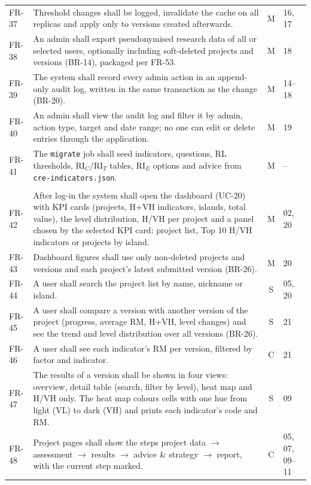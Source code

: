 \documentclass[11pt,a4paper]{article}
\newcommand{\RIC}{\mathrm{RI}_{C}}
\newcommand{\RIT}{\mathrm{RI}_{T}}
\newcommand{\RIE}{\mathrm{RI}_{E}}
\newcommand{\RM}{\mathrm{RM}}
\begin{document}
\begin{longtable}{@{}l R{11.2cm} c l@{}}
FR-37 & Threshold changes shall be logged, invalidate the cache on all replicas and apply only to versions created afterwards. & M & 16, 17 \\
FR-38 & An admin shall export pseudonymised research data of all or selected users, optionally including soft-deleted projects and versions (BR-14), packaged per FR-53. & M & 18 \\
FR-39 & The system shall record every admin action in an append-only audit log, written in the same transaction as the change (BR-20). & M & 14--18 \\
FR-40 & An admin shall view the audit log and filter it by admin, action type, target and date range; no one can edit or delete entries through the application. & M & 19 \\
FR-41 & The \texttt{migrate} job shall seed indicators, questions, RL thresholds, $\RIC$/$\RIT$ tables, $\RIE$ options and advice from \texttt{cre-indicators.json}. & M & -- \\
\\
FR-42 & After log-in the system shall open the dashboard (UC-20) with KPI cards (projects, H+VH indicators, islands, total value), the level distribution, H/VH per project and a panel chosen by the selected KPI card: project list, Top 10 H/VH indicators or projects by island. & M & 02, 20 \\
FR-43 & Dashboard figures shall use only non-deleted projects and versions and each project's latest submitted version (BR-26). & M & 20 \\
FR-44 & A user shall search the project list by name, nickname or island. & S & 05, 20 \\
FR-45 & A user shall compare a version with another version of the project (progress, average $\RM$, H+VH, level changes) and see the trend and level distribution over all versions (BR-26). & S & 21 \\
FR-46 & A user shall see each indicator's $\RM$ per version, filtered by factor and indicator. & C & 21 \\
FR-47 & The results of a version shall be shown in four views: overview, detail table (search, filter by level), heat map and H/VH only. The heat map colours cells with one hue from light (VL) to dark (VH) and prints each indicator's code and $\RM$. & S & 09 \\
FR-48 & Project pages shall show the steps project data $\to$ assessment $\to$ results $\to$ advice \& strategy $\to$ report, with the current step marked. & C & 05, 07, 09--11 \\

\end{longtable}
\end{document}
